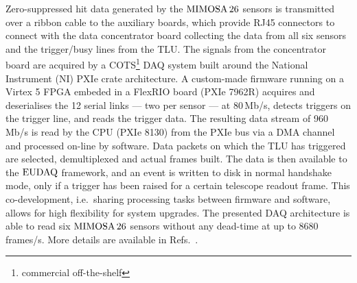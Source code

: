 Zero-suppressed hit data generated by the $\textrm{MIMOSA\,26}$ sensors is transmitted over a ribbon cable to the auxiliary boards,
 which provide RJ45 connectors to connect with the data concentrator board collecting the data from all six sensors and the trigger/busy lines from the TLU.
The signals from the concentrator board are acquired by a COTS\footnote{commercial off-the-shelf} DAQ system built around the National Instrument (NI) PXIe crate architecture. 
A custom-made firmware running on a Virtex 5 FPGA embeded in a FlexRIO board (PXIe 7962R) acquires and deserialises the 12 serial links --- two per sensor --- at 80\,Mb/s,
 detects triggers on the trigger line, and reads the trigger data. 
The resulting data stream of 960 Mb/s is read by the CPU (PXIe 8130) from the PXIe bus via a DMA channel and processed on-line by software. 
Data packets on which the TLU has triggered are selected, demultiplexed and actual frames built. 
The data is then available to the $\textrm{EUDAQ}$ framework, and an event is written to disk in normal handshake mode, only if a trigger has been raised for a certain telescope readout frame. 
This co-development, i.e.\ sharing processing tasks between firmware and software, allows for high flexibility for system upgrades. 
The presented DAQ architecture is able to read six $\textrm{MIMOSA\,26}$ sensors without any dead-time at up to 8680 frames/s.
More details are available in Refs.~\cite{EUDET-2010-25,Claus}.
 
 